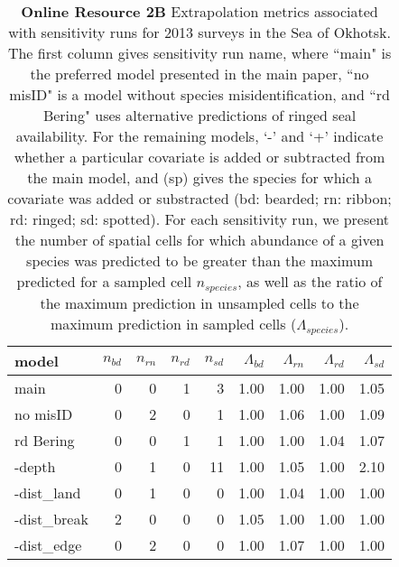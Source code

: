 \documentclass{svjour3}
\begin{document}
\begin{table}[htbp]
\centering
\caption{\textbf{Online Resource 2B} Extrapolation metrics associated with sensitivity runs for 2013 surveys in the Sea of Okhotsk. The first column gives sensitivity run name, where ``main" is the preferred model presented in the main paper, ``no misID" is a model without species misidentification, and ``rd Bering" uses alternative predictions of ringed seal availability.  For the remaining models,  `-' and `+' indicate whether a particular covariate is added or subtracted from the main model, and (sp) gives the species for which a covariate was added or substracted (bd: bearded; rn: ribbon; rd: ringed; sd: spotted).  For each sensitivity run, we present the number of spatial cells for which abundance of a given species was predicted to be greater than the maximum predicted for a sampled cell $n_{species}$, as well as the ratio of the maximum prediction in unsampled cells to the maximum prediction in sampled cells ($\Lambda_{species}$).}
\begin{tabular}{lrrrrrrrr}
  \hline
model & $n_{bd}$ & $n_{rn}$ & $n_{rd}$ & $n_{sd}$ & $\Lambda_{bd}$ & $\Lambda_{rn}$ & $\Lambda_{rd}$ & $\Lambda_{sd}$ \\
  \hline
main & 0 & 0 & 1 & 3 & 1.00 & 1.00 & 1.00 & 1.05 \\
  no misID & 0 & 2 & 0 & 1 & 1.00 & 1.06 & 1.00 & 1.09 \\
  rd Bering & 0 & 0 & 1 & 1 & 1.00 & 1.00 & 1.04 & 1.07 \\
  -depth & 0 & 1 & 0 & 11 & 1.00 & 1.05 & 1.00 & 2.10 \\
  -dist\_land & 0 & 1 & 0 & 0 & 1.00 & 1.04 & 1.00 & 1.00 \\
  -dist\_break & 2 & 0 & 0 & 0 & 1.05 & 1.00 & 1.00 & 1.00 \\
  -dist\_edge & 0 & 2 & 0 & 0 & 1.00 & 1.07 & 1.00 & 1.00 \\
   \hline
\end{tabular}
\label{tab:sensOkhotsk}
\end{table}
\end{document}
